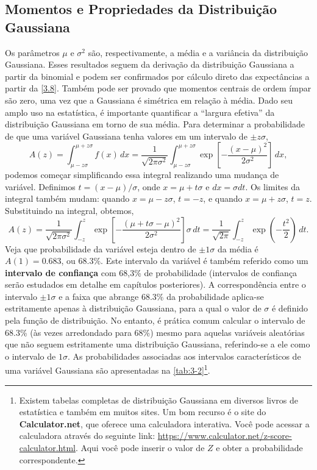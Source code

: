 \subsection{Momentos e Propriedades da Distribuição Gaussiana}

Os parâmetros $\mu$ e $\sigma^2$ são, respectivamente, a média e a variância da distribuição Gaussiana. Esses resultados seguem da derivação da distribuição Gaussiana a partir da binomial e podem ser confirmados por cálculo direto das expectâncias a partir da \autoref{3.8}. Também pode ser provado que momentos centrais de ordem ímpar são zero, uma vez que a Gaussiana é simétrica em relação à média. Dado seu amplo uso na estatística, é importante quantificar a ``largura efetiva'' da distribuição Gaussiana em torno de sua média. Para determinar a probabilidade de que uma variável Gaussiana tenha valores em um intervalo de $\pm z\sigma$,
\begin{equation*}
A(z) = \int_{\mu - z \sigma}^{\mu + z \sigma} f(x) \, dx = \dfrac{1}{\sqrt{2\pi\sigma^2}} \int_{\mu - z \sigma}^{\mu + z \sigma}  \exp\left[-\dfrac{(x - \mu)^2}{2\sigma^2}\right] \, dx,
\end{equation*}
podemos começar simplificando essa integral realizando uma mudança de variável. Definimos $t = (x - \mu) / \sigma$, onde $x = \mu + t\sigma$ e $dx = \sigma dt$. Os limites da integral também mudam: quando $x = \mu - z\sigma$, $t = -z$, e quando $x = \mu + z\sigma$, $t = z$. Substituindo na integral, obtemos,
\begin{equation}\label{3.11}
A(z) = \dfrac{1}{\sqrt{2\pi\sigma^2}} \int_{-z}^{z} \exp\left[-\dfrac{(\mu + t\sigma - \mu)^2}{2\sigma^2}\right] \sigma \,dt = \dfrac{1}{\sqrt{2\pi}} \int_{-z}^{z} \exp\left(-\dfrac{t^2}{2}\right) \, dt.
\end{equation}
Veja que probabilidade da variável esteja dentro de $\pm 1\sigma$ da média é $A(1) = 0.683$, ou $68.3\%$. Este intervalo da variável é também referido como um \textbf{intervalo de confiança} com 68,3\% de probabilidade (intervalos de confiança serão estudados em detalhe em capítulos posteriores). A correspondência entre o intervalo $\pm 1\sigma$ e a faixa que abrange 68.3\% da probabilidade aplica-se estritamente apenas à distribuição Gaussiana, para a qual o valor de $\sigma$ é definido pela função de distribuição. No entanto, é prática comum calcular o intervalo de 68.3\% (às vezes arredondado para 68\%) mesmo para aquelas variáveis aleatórias que não seguem estritamente uma distribuição Gaussiana, referindo-se a ele como o intervalo de $1\sigma$. As probabilidades associadas aos intervalos característicos de uma variável Gaussiana são apresentadas na \autoref{tab:3-2}\footnote{Existem tabelas completas de distribuição Gaussiana em diversos livros de estatística e também em muitos sites. Um bom recurso é o site do \textbf{Calculator.net}, que oferece uma calculadora interativa. Você pode acessar a calculadora através do seguinte link: \url{https://www.calculator.net/z-score-calculator.html}. Aqui você pode inserir o valor de $Z$ e obter a probabilidade correspondente.}.

